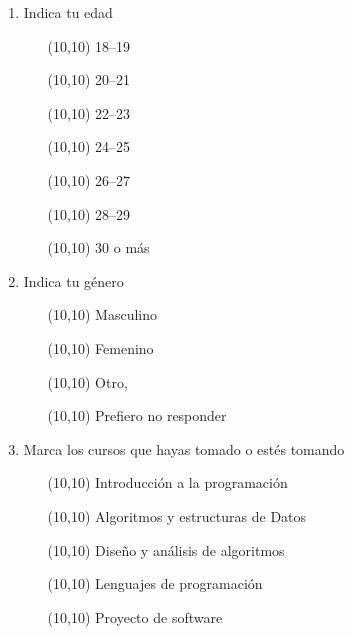 \begin{enumerate}

\item{Indica tu edad}
    \begin{itemize}
        \item[\framebox(10,10){ }]{18--19}
        \item[\framebox(10,10){ }]{20--21}
        \item[\framebox(10,10){ }]{22--23}
        \item[\framebox(10,10){ }]{24--25}
        \item[\framebox(10,10){ }]{26--27}
        \item[\framebox(10,10){ }]{28--29}
        \item[\framebox(10,10){ }]{30 o más}
    \end{itemize}

\item{Indica tu género}
    \begin{itemize}
        \item[\framebox(10,10){ }]{Masculino}
        \item[\framebox(10,10){ }]{Femenino}
        \item[\framebox(10,10){ }]{Otro, }
        \item[\framebox(10,10){ }]{Prefiero no responder}
    \end{itemize}

\item{Marca los cursos que hayas tomado o estés tomando}
    \begin{itemize}
        \item[\framebox(10,10){ }] Introducción a la programación
        \item[\framebox(10,10){ }] Algoritmos y estructuras de Datos
        \item[\framebox(10,10){ }] Diseño y análisis de algoritmos
        \item[\framebox(10,10){ }] Lenguajes de programación
        \item[\framebox(10,10){ }] Proyecto de software
    \end{itemize}
\end{enumerate}
